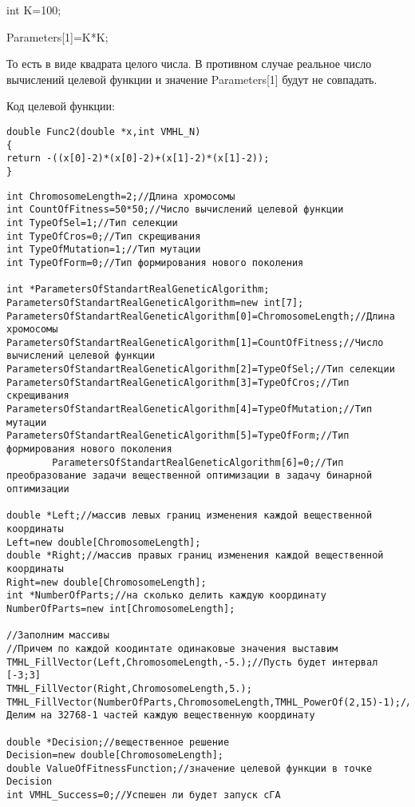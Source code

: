 \documentclass[a4paper,12pt]{article}
\begin{document}
int K=100;

Parameters[1]=K*K;

То есть в виде квадрата целого числа. В противном случае реальное число вычислений целевой функции и значение Parameters[1] будут не совпадать.

Код целевой функции:
\begin{lstlisting}[caption=Оптимизируемая функция]
double Func2(double *x,int VMHL_N)
{
return -((x[0]-2)*(x[0]-2)+(x[1]-2)*(x[1]-2));
}
\end{lstlisting}


\begin{lstlisting}[label=code_use_MHL_StandartRealGeneticAlgorithm,caption=Пример использования]
int ChromosomeLength=2;//Длина хромосомы
int CountOfFitness=50*50;//Число вычислений целевой функции
int TypeOfSel=1;//Тип селекции
int TypeOfCros=0;//Тип скрещивания
int TypeOfMutation=1;//Тип мутации
int TypeOfForm=0;//Тип формирования нового поколения

int *ParametersOfStandartRealGeneticAlgorithm;
ParametersOfStandartRealGeneticAlgorithm=new int[7];
ParametersOfStandartRealGeneticAlgorithm[0]=ChromosomeLength;//Длина хромосомы
ParametersOfStandartRealGeneticAlgorithm[1]=CountOfFitness;//Число вычислений целевой функции
ParametersOfStandartRealGeneticAlgorithm[2]=TypeOfSel;//Тип селекции
ParametersOfStandartRealGeneticAlgorithm[3]=TypeOfCros;//Тип скрещивания
ParametersOfStandartRealGeneticAlgorithm[4]=TypeOfMutation;//Тип мутации
ParametersOfStandartRealGeneticAlgorithm[5]=TypeOfForm;//Тип формирования нового поколения
		ParametersOfStandartRealGeneticAlgorithm[6]=0;//Тип преобразование задачи вещественной оптимизации в задачу бинарной оптимизации

double *Left;//массив левых границ изменения каждой вещественной координаты
Left=new double[ChromosomeLength];
double *Right;//массив правых границ изменения каждой вещественной координаты
Right=new double[ChromosomeLength];
int *NumberOfParts;//на сколько делить каждую координату
NumberOfParts=new int[ChromosomeLength];

//Заполним массивы
//Причем по каждой коодинтате одинаковые значения выставим
TMHL_FillVector(Left,ChromosomeLength,-5.);//Пусть будет интервал [-3;3]
TMHL_FillVector(Right,ChromosomeLength,5.);
TMHL_FillVector(NumberOfParts,ChromosomeLength,TMHL_PowerOf(2,15)-1);//Делим на 32768-1 частей каждую вещественную координату

double *Decision;//вещественное решение
Decision=new double[ChromosomeLength];
double ValueOfFitnessFunction;//значение целевой функции в точке Decision
int VMHL_Success=0;//Успешен ли будет запуск cГА


\end{lstlisting}
\end{document}
